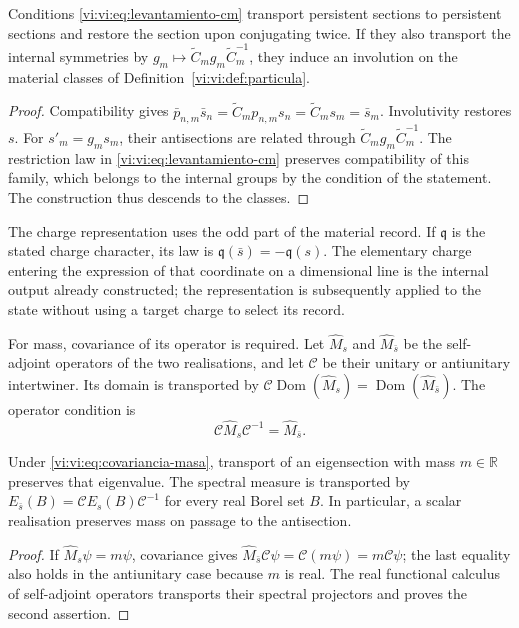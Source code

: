 \begin{proposition}
\label{vi:vi:prop:antiseccion-persistente}
Conditions \eqref{vi:vi:eq:levantamiento-cm} transport persistent
sections to persistent sections and restore the section upon
conjugating twice. If they also transport the internal symmetries by
$g_m\mapsto\widetilde C_mg_m\widetilde C_m^{-1}$, they induce an
involution on the material classes of
Definition~\ref{vi:vi:def:particula}.
\end{proposition}
\begin{proof}
Compatibility gives
$\bar p_{n,m}\bar s_n=\widetilde C_mp_{n,m}s_n
=\widetilde C_ms_m=\bar s_m$.
Involutivity restores $s$. For $s'_m=g_ms_m$, their
antisections are related through
$\widetilde C_mg_m\widetilde C_m^{-1}$. The restriction law
in \eqref{vi:vi:eq:levantamiento-cm} preserves compatibility of this
family, which belongs to the internal groups by the condition of the
statement. The construction thus descends to the classes.
\end{proof}

The charge representation uses the odd part of the material
record. If $\mathfrak q$ is the stated charge character, its
law is $\mathfrak q(\bar s)=-\mathfrak q(s)$. The elementary charge
entering the expression of that coordinate on a dimensional line is
the internal output already constructed; the representation is subsequently applied
to the state without using a target charge to select its record.

For mass, covariance of its operator is required. Let
$\widehat M_s$ and $\widehat M_{\bar s}$ be the self-adjoint operators
of the two realisations, and let $\mathcal C$ be their unitary
or antiunitary intertwiner. Its domain is transported by
$\mathcal C\operatorname{Dom}(\widehat M_s)
=\operatorname{Dom}(\widehat M_{\bar s})$. The operator condition is
\begin{equation}
 \mathcal C\widehat M_s\mathcal C^{-1}
 =\widehat M_{\bar s}.
 \label{vi:vi:eq:covariancia-masa}
\end{equation}

\begin{proposition}
\label{vi:vi:prop:masa-conjugada}
Under \eqref{vi:vi:eq:covariancia-masa}, transport of an eigensection
with mass $m\in\mathbb R$ preserves that eigenvalue. The spectral
measure is transported by
$E_{\bar s}(B)=\mathcal C E_s(B)\mathcal C^{-1}$ for every real
Borel set $B$. In particular, a scalar realisation preserves
mass on passage to the antisection.
\end{proposition}
\begin{proof}
If $\widehat M_s\psi=m\psi$, covariance gives
$\widehat M_{\bar s}\mathcal C\psi
=\mathcal C(m\psi)=m\mathcal C\psi$; the last equality
also holds in the antiunitary case because $m$ is real. The real
functional calculus of self-adjoint operators transports their
spectral projectors and proves the second assertion.
\end{proof}

